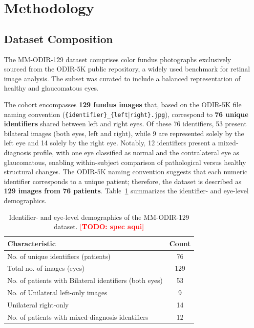 \documentclass[runningheads]{llncs}
\newcommand{\todo}[1]{\textcolor{red}{\textbf{[TODO: #1]}}}
\begin{document}
\section{Methodology}

\subsection{Dataset Composition}
\label{sec:dataset-proposed}

The MM-ODIR-129 dataset comprises color fundus photographs exclusively sourced from the ODIR-5K public repository\cite{odir2019}, a widely used benchmark for retinal image analysis. The subset was curated to include a balanced representation of healthy and glaucomatous eyes.

The cohort encompasses \textbf{129 fundus images} that, based on the ODIR-5K file naming convention (\texttt{\{identifier\}\_\{left$|$right\}.jpg}), correspond to \textbf{76 unique identifiers} shared between left and right eyes. Of these 76 identifiers, 53 present bilateral images (both eyes, left and right), while 9 are represented solely by the left eye and 14 solely by the right eye. Notably, 12 identifiers present a mixed-diagnosis profile, with one eye classified as normal and the contralateral eye as glaucomatous, enabling within-subject comparison of pathological versus healthy structural changes. The ODIR-5K naming convention suggests that each numeric identifier corresponds to a unique patient; therefore, the dataset is described as \textbf{129 images from 76 patients}. Table~\ref{tab:demographics} summarizes the identifier- and eye-level demographics.

\begin{table}[htbp]
  \centering
  \caption{Identifier- and eye-level demographics of the MM-ODIR-129 dataset. \todo{spec aqui}}
  \label{tab:demographics}
  \begin{tabular}{lc}
    \toprule
    \textbf{Characteristic} & \textbf{Count} \\
    \midrule
    No. of unique identifiers (patients) & 76 \\
    Total no. of images (eyes) & 129 \\
    No. of patients with Bilateral identifiers (both eyes) & 53 \\
    No. of Unilateral left-only images & 9 \\
    Unilateral right-only & 14 \\
    No. of patients with mixed-diagnosis identifiers  & 12 \\
    \bottomrule
  \end{tabular}
\end{table}
\end{document}
